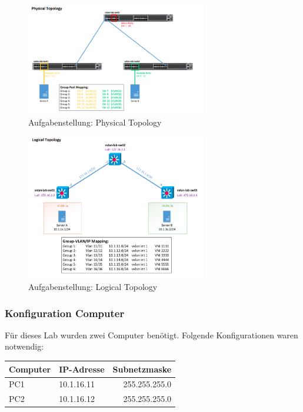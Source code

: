 \documentclass[a4,12pt]{scrartcl}
\begin{document}
\begin{figure} [H]
	\begin{center}
	\includegraphics[width=0.70\textwidth]{./pictures/vxlan_physical.png}
	\caption{Aufgabenstellung: Physical Topology}
	\label{x}
	\end{center}
\end{figure}

\begin{figure} [H]
	\begin{center}
	\includegraphics[width=0.70\textwidth]{./pictures/vxlan_logical.png}
	\caption{Aufgabenstellung: Logical Topology}
	\label{x}
	\end{center}
\end{figure}
\newpage

\subsubsection{Konfiguration Computer}
Für dieses Lab wurden zwei Computer benötigt. Folgende Konfigurationen waren notwendig: 
\begin{center}
    \begin{tabular}{@{} l l r@{}}\toprule    
    {Computer} & {IP-Adresse} & {Subnetzmaske}\\ \midrule
    PC1 & 10.1.16.11 & 255.255.255.0\\ \addlinespace
    PC2 & 10.1.16.12 & 255.255.255.0\\ 
    \bottomrule
    \end{tabular}
\end{center}
\end{document}
